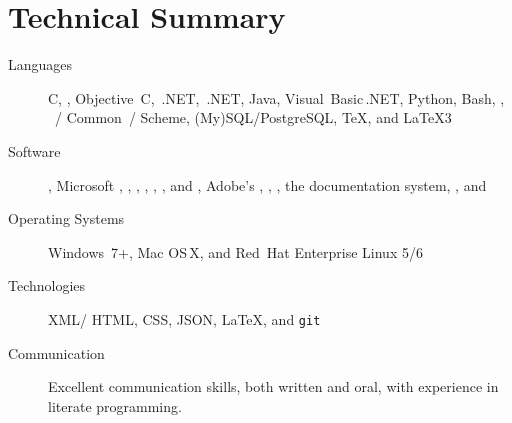 \documentclass{bettercv}
\begin{document}
\maketitle
\section{Technical Summary}

\begin{description}
\item[Languages]
  C,
  \CPP,
  Objective~C,
  \CPP\,.NET,
  \CSharp\,.NET,
  Java,
  Visual~Basic\,.NET,
  Python,
  Bash,
  ,
  ~\Lisp\slash
            Common~\Lisp\slash
            Scheme,
  (My)SQL\slash PostgreSQL,
  \TeX,
  and \LaTeX3

\item[Software]
  ,
  Microsoft ,
            ,
            ,
            ,
            ,
            ,
            and ,
  Adobe's
    ,
    ,
    ,
  the  documentation system,
  ,
  and

\item[Operating Systems]
  Windows~7+,
  Mac OS\,X,
  and
  Red~Hat Enterprise Linux 5\slash 6

\item[Technologies]
  XML\slash
  HTML,
  CSS,
  JSON,
  \LaTeX,
  and \texttt{git}

\item[Communication]
  Excellent communication skills, both written and oral,
    with experience in literate programming.
\end{description}
\end{document}

